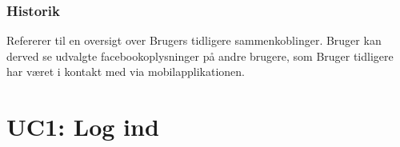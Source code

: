 \subsubsection{Historik}
Refererer til en oversigt over Brugers tidligere sammenkoblinger. Bruger kan derved se udvalgte facebookoplysninger på andre brugere, som Bruger tidligere har været i kontakt med via mobilapplikationen.

 \newpage



\newpage

\section{UC1: Log ind}

